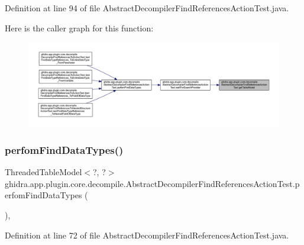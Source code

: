Definition at line 94 of file Abstract\+Decompiler\+Find\+References\+Action\+Test.\+java.

Here is the caller graph for this function\+:
\nopagebreak
\begin{figure}[H]
\begin{center}
\leavevmode
\includegraphics[width=350pt]{classghidra_1_1app_1_1plugin_1_1core_1_1decompile_1_1_abstract_decompiler_find_references_action_test_ab222409e434c109cfeb9d28de92365b9_icgraph}
\end{center}
\end{figure}
\mbox{\label{classghidra_1_1app_1_1plugin_1_1core_1_1decompile_1_1_abstract_decompiler_find_references_action_test_ac6f76cbf407c1f824b8859cd8fdb6889}} 
\subsubsection{\texorpdfstring{perfomFindDataTypes()}{perfomFindDataTypes()}}
{\footnotesize\ttfamily Threaded\+Table\+Model$<$?, ?$>$ ghidra.\+app.\+plugin.\+core.\+decompile.\+Abstract\+Decompiler\+Find\+References\+Action\+Test.\+perfom\+Find\+Data\+Types (\begin{DoxyParamCaption}{ }\end{DoxyParamCaption})\hspace{0.3cm}{\ttfamily [inline]}, {\ttfamily [protected]}}



Definition at line 72 of file Abstract\+Decompiler\+Find\+References\+Action\+Test.\+java.

